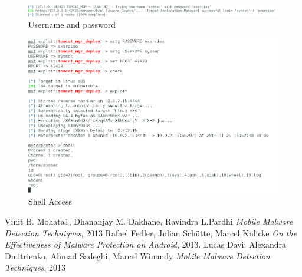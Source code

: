 \documentclass[a4paper,11pt]{article}
\begin{document}
\begin{figure} \center
  \includegraphics[width=0.9\linewidth]{login.png}
  \caption{Username and password}
  \label{fig:login}
\end{figure}
\begin{figure} \center
  \includegraphics[width=0.8\linewidth]{shell.png}
  \caption{Shell Access}
  \label{fig:shell}
\end{figure}

\begin{thebibliography}{1}
   Vinit B. Mohata1, Dhananjay M. Dakhane, Ravindra L.Pardhi
    {\em Mobile Malware Detection Techniques}, 2013
   Rafael Fedler, Julian Schütte, Marcel Kulicke
    {\em On the Effectiveness of Malware Protection on Android}, 2013.
   Lucas Davi, Alexandra Dmitrienko, Ahmad Sadeghi, Marcel Winandy
    {\em Mobile Malware Detection Techniques}, 2013
\end{thebibliography}
\end{document}
